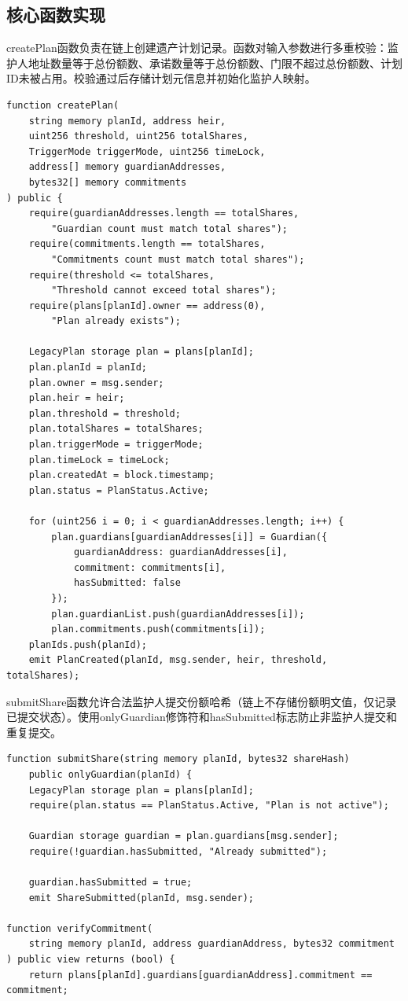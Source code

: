 \documentclass[UTF8,a4paper,zihao=-4,openany]{ctexrep}
\begin{document}
\subsection{核心函数实现}

createPlan函数负责在链上创建遗产计划记录。函数对输入参数进行多重校验：监护人地址数量等于总份额数、承诺数量等于总份额数、门限不超过总份额数、计划ID未被占用。校验通过后存储计划元信息并初始化监护人映射。

\begin{lstlisting}[style=solidity,caption={createPlan函数 (LegacyContract.sol:60-117, 节选)}]
function createPlan(
    string memory planId, address heir,
    uint256 threshold, uint256 totalShares,
    TriggerMode triggerMode, uint256 timeLock,
    address[] memory guardianAddresses,
    bytes32[] memory commitments
) public {
    require(guardianAddresses.length == totalShares,
        "Guardian count must match total shares");
    require(commitments.length == totalShares,
        "Commitments count must match total shares");
    require(threshold <= totalShares,
        "Threshold cannot exceed total shares");
    require(plans[planId].owner == address(0),
        "Plan already exists");

    LegacyPlan storage plan = plans[planId];
    plan.planId = planId;
    plan.owner = msg.sender;
    plan.heir = heir;
    plan.threshold = threshold;
    plan.totalShares = totalShares;
    plan.triggerMode = triggerMode;
    plan.timeLock = timeLock;
    plan.createdAt = block.timestamp;
    plan.status = PlanStatus.Active;

    for (uint256 i = 0; i < guardianAddresses.length; i++) {
        plan.guardians[guardianAddresses[i]] = Guardian({
            guardianAddress: guardianAddresses[i],
            commitment: commitments[i],
            hasSubmitted: false
        });
        plan.guardianList.push(guardianAddresses[i]);
        plan.commitments.push(commitments[i]);
    planIds.push(planId);
    emit PlanCreated(planId, msg.sender, heir, threshold, totalShares);
\end{lstlisting}

submitShare函数允许合法监护人提交份额哈希（链上不存储份额明文值，仅记录已提交状态）。使用onlyGuardian修饰符和hasSubmitted标志防止非监护人提交和重复提交。

\begin{lstlisting}[style=solidity,caption={submitShare与verifyCommitment (LegacyContract.sol:163-185)}]
function submitShare(string memory planId, bytes32 shareHash)
    public onlyGuardian(planId) {
    LegacyPlan storage plan = plans[planId];
    require(plan.status == PlanStatus.Active, "Plan is not active");

    Guardian storage guardian = plan.guardians[msg.sender];
    require(!guardian.hasSubmitted, "Already submitted");

    guardian.hasSubmitted = true;
    emit ShareSubmitted(planId, msg.sender);

function verifyCommitment(
    string memory planId, address guardianAddress, bytes32 commitment
) public view returns (bool) {
    return plans[planId].guardians[guardianAddress].commitment == commitment;
\end{lstlisting}
\end{document}
